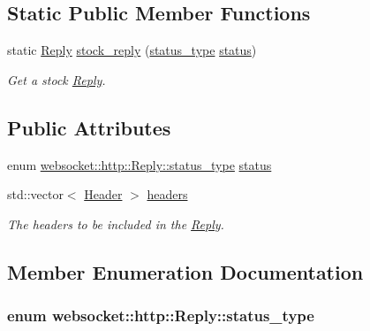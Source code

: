 \subsection*{Static Public Member Functions}
\begin{DoxyCompactItemize}
\item 
static \hyperlink{structwebsocket_1_1http_1_1Reply}{Reply} \hyperlink{structwebsocket_1_1http_1_1Reply_a96b71498c73c3925edd06359da59675b}{stock\+\_\+reply} (\hyperlink{structwebsocket_1_1http_1_1Reply_ab5757d7340f55ea26952d8a4b26ecff2}{status\+\_\+type} \hyperlink{structwebsocket_1_1http_1_1Reply_afa1b8fc57be88cfc33b7788d37ae42b8}{status})
\begin{DoxyCompactList}\small\item\em Get a stock \hyperlink{structwebsocket_1_1http_1_1Reply}{Reply}. \end{DoxyCompactList}\end{DoxyCompactItemize}
\subsection*{Public Attributes}
\begin{DoxyCompactItemize}
\item 
enum \hyperlink{structwebsocket_1_1http_1_1Reply_ab5757d7340f55ea26952d8a4b26ecff2}{websocket\+::http\+::\+Reply\+::status\+\_\+type} \hyperlink{structwebsocket_1_1http_1_1Reply_afa1b8fc57be88cfc33b7788d37ae42b8}{status}
\item 
std\+::vector$<$ \hyperlink{structwebsocket_1_1http_1_1Header}{Header} $>$ \hyperlink{structwebsocket_1_1http_1_1Reply_aa88f08563abdf43f15d7ff694ffd06e2}{headers}
\begin{DoxyCompactList}\small\item\em The headers to be included in the \hyperlink{structwebsocket_1_1http_1_1Reply}{Reply}. \end{DoxyCompactList}\end{DoxyCompactItemize}


\subsection{Member Enumeration Documentation}
\subsubsection[{\texorpdfstring{status\+\_\+type}{status_type}}]{\setlength{\rightskip}{0pt plus 5cm}enum {\bf websocket\+::http\+::\+Reply\+::status\+\_\+type}}\hypertarget{structwebsocket_1_1http_1_1Reply_ab5757d7340f55ea26952d8a4b26ecff2}{}\label{structwebsocket_1_1http_1_1Reply_ab5757d7340f55ea26952d8a4b26ecff2}


